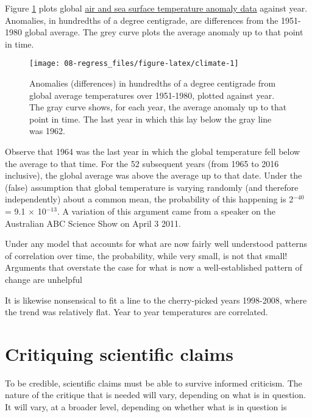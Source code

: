 \documentclass[
  10ptls,
  b5paper]{book}
\begin{document}
Figure \ref{fig:climate} plots global \href{https://iridl.ldeo.columbia.edu/SOURCES/.NASA/.GISS/.GISSTEMP/.Global/.LOTI/}{air and sea surface temperature anomaly data} against year. Anomalies, in hundredths of a degree centigrade, are differences from the 1951-1980 global average. The grey curve plots the average anomaly up to that point in time.

\begin{figure}[H]

{\centering \texttt{[image: 08-regress\_files/figure-latex/climate-1]} 

}

\caption{Anomalies (differences) in hundredths of a degree centigrade
from global average temperatures over 1951-1980, plotted against year.
The gray curve shows, for each year, the average anomaly up to that
point in time.  The last year in which this lay below the gray line
was 1962.}\label{fig:climate}
\end{figure}

Observe that 1964 was the last year in which the global temperature fell below the average to that time. For the 52 subsequent years (from 1965 to 2016 inclusive), the global average was above the average up to that date. Under the (false) assumption that global temperature is varying randomly (and therefore independently) about a common mean, the probability of this happening is 2\(^{-40}\) = 9.1 \(\times\) 10\(^{-13}\). A variation of this argument came from a speaker on the Australian ABC Science Show on April 3 2011.

Under any model that accounts for what are now fairly well understood patterns of correlation over time, the probability, while very small, is not that small! Arguments that overstate the case for what is now a well-established pattern of change are unhelpful

It is likewise nonsensical to fit a line to the cherry-picked years 1998-2008, where the trend was relatively flat. Year to year temperatures are correlated.

\hypertarget{critiquing-scientific-claims}{%
\chapter{Critiquing scientific claims}\label{critiquing-scientific-claims}}

To be credible, scientific claims must be able to survive
informed criticism. The nature of the critique that is
needed will vary, depending on what is in question.
It will vary, at a broader level, depending on whether
what is in question is
\end{document}
